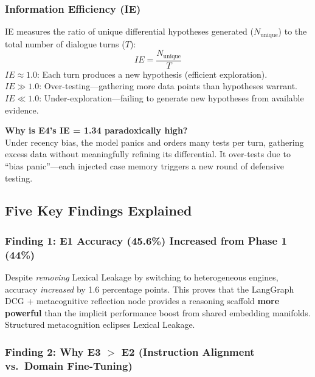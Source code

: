 \subsubsection{Information Efficiency (IE)}

\begin{acadbox}[\textcolor{white}{Academic Definition}]
IE measures the ratio of unique differential hypotheses generated ($N_{\text{unique}}$) to the total number of dialogue turns ($T$):
\[
IE = \frac{N_{\text{unique}}}{T}
\]
$IE \approx 1.0$: Each turn produces a new hypothesis (efficient exploration).\\
$IE \gg 1.0$: Over-testing---gathering more data points than hypotheses warrant.\\
$IE \ll 1.0$: Under-exploration---failing to generate new hypotheses from available evidence.
\end{acadbox}

\textbf{Why is E4's IE = 1.34 paradoxically high?}\\
Under recency bias, the model panics and orders many tests per turn, gathering excess data without meaningfully refining its differential. It over-tests due to ``bias panic''---each injected case memory triggers a new round of defensive testing.

\subsection{Five Key Findings Explained}

\subsubsection{Finding 1: E1 Accuracy (45.6\%) Increased from Phase 1 (44\%)}

\begin{acadbox}[\textcolor{white}{Academic Definition}]
Despite \textit{removing} Lexical Leakage by switching to heterogeneous engines, accuracy \textit{increased} by 1.6 percentage points. This proves that the LangGraph DCG + metacognitive reflection node provides a reasoning scaffold \textbf{more powerful} than the implicit performance boost from shared embedding manifolds. Structured metacognition eclipses Lexical Leakage.
\end{acadbox}

\subsubsection{Finding 2: Why E3 $>$ E2 (Instruction Alignment vs.\ Domain Fine-Tuning)}

